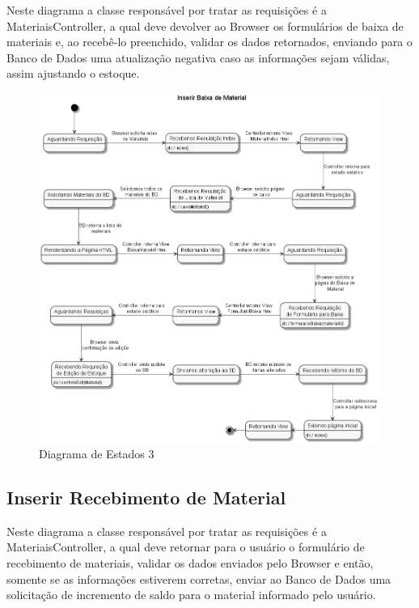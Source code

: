 \documentclass[rascunho,xindy,acronym,symbols]{fei}
\begin{document}
Neste diagrama a classe responsável por tratar as requisições é a MateriaisController, a qual deve devolver ao Browser os formulários de baixa de materiais e, ao recebê-lo preenchido, validar os dados retornados, enviando para o Banco de Dados uma atualização negativa caso as informações sejam válidas, assim ajustando o estoque.

\begin{figure}[H]
    \centering
    \includegraphics[width=\textwidth]{./Images/DE_-_Inserir_Baixa_de_Material.png}
    \caption{Diagrama de Estados 3}
    \label{fig:diag_est3}
\end{figure}

\subsection{Inserir Recebimento de Material}

Neste diagrama a classe responsável por tratar as requisições é a MateriaisController, a qual deve retornar para o usuário o formulário de recebimento de materiais, validar os dados enviados pelo Browser e então, somente se as informações estiverem corretas, enviar ao Banco de Dados uma solicitação de incremento de saldo para o material informado pelo usuário.
\end{document}
